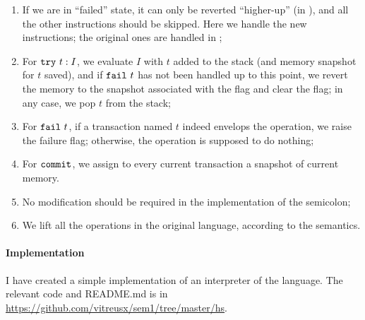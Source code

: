\documentclass{../../psv}
\begin{document}
  \begin{enumerate}
    \item[\hs{[OnFail]}] If we are in ``failed'' state, it can only be reverted ``higher-up'' (in \hs{[Try]}), and all the other instructions should be skipped. Here we handle the new instructions; the original ones are handled in ;
    \item[\hs{[Try]}] For $\mathtt{try}\ t: I$, we evaluate $I$ with $t$ added to the stack (and memory snapshot for $t$ saved), and if $\mathtt{fail}\ t$ has not been handled up to this point, we revert the memory to the snapshot associated with the flag and clear the flag; in any case, we pop $t$ from the stack;
    \item[\hs{[Fail]}] For $\mathtt{fail}\ t$, if a transaction named $t$ indeed envelops the operation, we raise the failure flag; otherwise, the operation is supposed to do nothing;
    \item[\hs{[Commit]}] For $\mathtt{commit}$, we assign to every current transaction a snapshot of current memory.
    \item[\hs{[Seq]}] No modification should be required in the implementation of the semicolon;
    \item[\hs{[Lift]}] We lift all the operations in the original language, according to the  semantics.
  \end{enumerate}

  \paragraph{Implementation} I have created a simple implementation of an interpreter of the language. The relevant code and README.md is in \url{https://github.com/vitreusx/sem1/tree/master/hs}.
\end{document}
